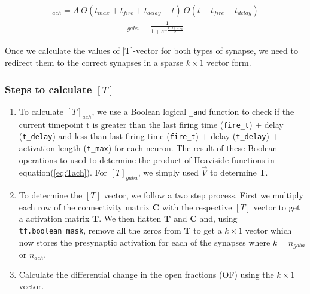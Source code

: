 \documentclass[10pt,letterpaper]{article}
\begin{document}
\begin{nolinenumbers}
\begin{eqnarray}[T]_{ach} = A\ \Theta(t_{max}+t_{fire}+t_{delay}-t)\ \Theta(t-t_{fire}-t_{delay})\label{eq:Tach}\end{eqnarray}
\begin{eqnarray}[T]_{gaba} = \frac{1}{1+e^{-\frac{V(t)-V_0}{\sigma}}}
\label{eq:Tgaba}
\end{eqnarray}

Once we calculate the values of [T]-vector for both types of synapse, we need to redirect them to the correct synapses in a sparse $k\times1$ vector form. 

\subsubsection*{Steps to calculate $[T]$}
\begin{enumerate}
\item  To calculate $[T]_{ach}$, we use a Boolean logical \texttt{\_and} function to check if the current timepoint t is greater than the last firing time (\texttt{fire\_t}) + delay (\texttt{t\_delay}) and less than last firing time (\texttt{fire\_t}) + delay (\texttt{t\_delay}) + activation length (\texttt{t\_max}) for each neuron. The result of these Boolean operations to used to determine the product of Heaviside functions in equation(\ref{eq:Tach}). For $[T]_{gaba}$, we simply used $\vec{V}$ to determine T.
\item To determine the $[T]$ vector, we follow a two step process. First we multiply each row of the connectivity matrix $\mathbf{C}$ with the respective $[T]$ vector to get a activation matrix $\mathbf{T}$. We then flatten $\mathbf{T}$ and $\mathbf{C}$ and, using \texttt{tf.boolean\_mask}, remove all the zeros from $\mathbf{T}$ to get a $k\times1$ vector which now stores the presynaptic activation for each of the synapses where $k=n_{gaba}$ or $n_{ach}$.
\item Calculate the differential change in the open fractions (OF) using the $k\times1$ vector.
\end{enumerate}


\end{nolinenumbers}
\end{document}
